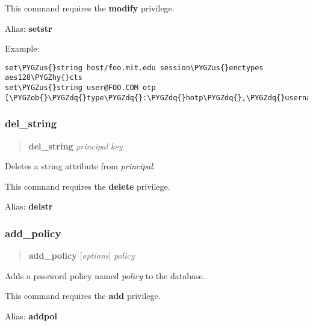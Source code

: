 \documentclass[letterpaper,10pt,english]{sphinxmanual}
\def\PYGZus{\char`\_}
\def\PYGZob{\char`\{}
\def\PYGZcb{\char`\}}
\def\PYGZhy{\char`\-}
\def\PYGZdq{\char`\"}
\begin{document}
This command requires the \textbf{modify} privilege.

Alias: \textbf{setstr}

Example:

\begin{Verbatim}[commandchars=\\\{\}]
set\PYGZus{}string host/foo.mit.edu session\PYGZus{}enctypes aes128\PYGZhy{}cts
set\PYGZus{}string user@FOO.COM otp [\PYGZob{}\PYGZdq{}type\PYGZdq{}:\PYGZdq{}hotp\PYGZdq{},\PYGZdq{}username\PYGZdq{}:\PYGZdq{}custom\PYGZdq{}\PYGZcb{}]
\end{Verbatim}
\label{admin/admin_commands/kadmin_local:set-string-end}

\subsubsection{del\_string}
\label{admin/admin_commands/kadmin_local:set-string-end}\label{admin/admin_commands/kadmin_local:del-string}\label{admin/admin_commands/kadmin_local:id11}\begin{quote}

\textbf{del\_string} \emph{principal} \emph{key}
\end{quote}

Deletes a string attribute from \emph{principal}.

This command requires the \textbf{delete} privilege.

Alias: \textbf{delstr}
\label{admin/admin_commands/kadmin_local:del-string-end}

\subsubsection{add\_policy}
\label{admin/admin_commands/kadmin_local:id12}\label{admin/admin_commands/kadmin_local:del-string-end}\label{admin/admin_commands/kadmin_local:add-policy}\begin{quote}

\textbf{add\_policy} {[}\emph{options}{]} \emph{policy}
\end{quote}

Adds a password policy named \emph{policy} to the database.

This command requires the \textbf{add} privilege.

Alias: \textbf{addpol}
\end{document}
